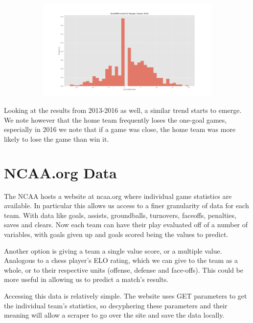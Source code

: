 \documentclass[11pt,a4paper]{article}
\begin{document}
\begin{figure}[htbp]
\begin{subfigure}[b]{0.475\textwidth}
        \end{subfigure}
        \quad
        \begin{subfigure}[b]{0.475\textwidth}   
            \centering 
            \includegraphics[width=\textwidth]{goal_diff_2016.png}
        \end{subfigure}
    \end{figure}

Looking at the results from 2013-2016 as well, a similar trend starts to emerge. We note however that the home team frequently loses the one-goal games, especially in 2016 we note that if a game was close, the home team was more likely to lose the game than win it.

\section*{NCAA.org Data}
The NCAA hosts a website at ncaa.org where individual game statistics are available. In particular this allows us access to a finer granularity of data for each team. With data like goals, assists, groundballs, turnovers, faceoffs, penalties, saves and clears. Now each team can have their play evaluated off of a number of variables, with goals given up and goals scored being the values to predict. 

Another option is giving a team a single value score, or a multiple value. Analogous to a chess player's ELO rating, which we can give to the team as a whole, or to their respective units (offense, defense and face-offs). This could be more useful in allowing us to predict a match's results.

Accessing this data is relatively simple. The website uses GET parameters to get the individual team's statistics, so decyphering these parameters and their meaning will allow a scraper to go over the site and save the data locally.
\end{document}
